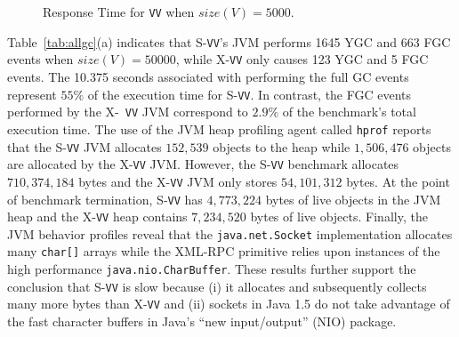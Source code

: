 \documentclass{sig-alternate}
\begin{document}
\begin{figure}[t]
\centering
{}
\vspace*{-.1in}
\caption{Response Time for {\tt VV} when $size(V)=5000$.}
\label{fig:ecdf}
\end{figure}



Table~\ref{tab:allgc}(a) indicates that S-{\tt VV}'s JVM performs 1645
YGC and 663 FGC events when $size(V)=50000$, while X-{\tt VV} only
causes 123 YGC and 5 FGC events.  The 10.375 seconds associated with
performing the full GC events represent $55\%$ of the execution time
for S-{\tt VV}.  In contrast, the FGC events performed by the X-{\tt
  VV} JVM correspond to $2.9\%$ of the benchmark's total execution
time.  The use of the JVM heap profiling agent called {\tt hprof}
reports that the S-{\tt VV} JVM allocates $152,539$ objects to the
heap while $1,506,476$ objects are allocated by the X-{\tt VV} JVM.
However, the S-{\tt VV} benchmark allocates $710,374,184$ bytes and
the X-{\tt VV} JVM only stores $54,101,312$ bytes.  At the point of
benchmark termination, S-{\tt VV} has $4,773,224$ bytes of live
objects in the JVM heap and the X-{\tt VV} heap contains $7,234,520$
bytes of live objects.  Finally, the JVM behavior profiles reveal that
the {\tt java.net.Socket} implementation allocates many {\tt char[]}
arrays while the XML-RPC primitive relies upon instances of the high
performance {\tt java.nio.CharBuffer}.  These results further support
the conclusion that S-{\tt VV} is slow because (i) it allocates and
subsequently collects many more bytes than X-{\tt VV} and (ii) sockets
in Java 1.5 do not take advantage of the fast character buffers in
Java's ``new input/output'' (NIO) package.
\end{document}
